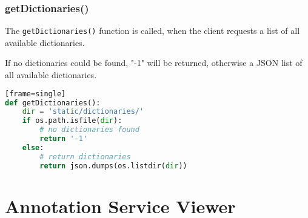 \subsubsection{getDictionaries()}
The \texttt{getDictionaries()} function is called, when the client requests a list of all available dictionaries.

If no dictionaries could be found, "-1" will be returned, otherwise a JSON list of all available dictionaries.

\begin{lstlisting}[language=Python][frame=single]
def getDictionaries():
	dir = 'static/dictionaries/'
	if os.path.isfile(dir):
		# no dictionaries found
		return '-1'
	else:
		# return dictionaries
		return json.dumps(os.listdir(dir))
\end{lstlisting}


\section{Annotation Service Viewer}
\label{sec_B2}